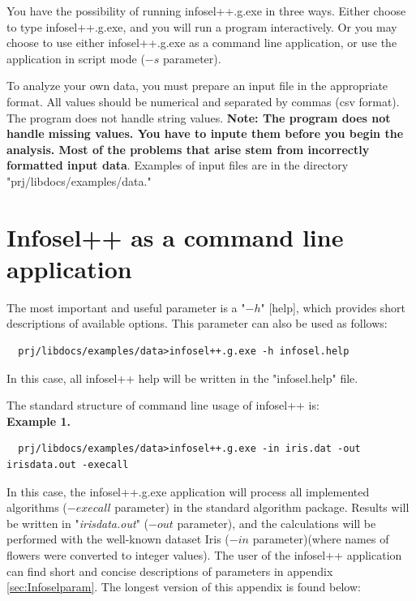 \documentclass[a4paper,fleqn]{report}
\begin{document}
You have the possibility of running infosel++.g.exe in three ways. Either choose to type infosel++.g.exe, and you will run a 
program interactively. Or you may choose to use either infosel++.g.exe as a command line application, or use the application 
in script mode ($-s$ parameter).

To analyze your own data, you must prepare an input file in the appropriate format. All values should be numerical 
and separated by commas (csv format). The program does not handle string values. {\bf Note: The program does not handle 
missing values. You have to inpute them before you begin the analysis. 
Most of the problems that arise stem from incorrectly formatted input data}. 
Examples of input files are in the directory "prj/libdocs/examples/data."

\section{Infosel++ as a command line application}

The most important and useful parameter is a "$-h$" [help], which provides short descriptions of available options. 
This parameter can also be used as follows: 
\begin{scriptsize}
  \begin{verbatim}
  prj/libdocs/examples/data>infosel++.g.exe -h infosel.help
  \end{verbatim}
\end{scriptsize}
In this case, all infosel++ help will be written in the "infosel.help" file.

The standard structure of command line usage of infosel++ is:
\\

{\bf Example 1.} 
\begin{scriptsize} \label{example:1}
  \begin{verbatim}
  prj/libdocs/examples/data>infosel++.g.exe -in iris.dat -out irisdata.out -execall 
  \end{verbatim}
\end{scriptsize}

In this case, the infosel++.g.exe application will process all implemented algorithms ($-execall$ parameter) 
in the standard algorithm package.
Results will be written in "{\it irisdata.out}" ($-out$ parameter), and the calculations will be performed 
with the well-known dataset Iris ($-in$ parameter)(where names of flowers were converted to integer values). 
The user of the infosel++ application can find 
short and concise descriptions of parameters in appendix \ref{sec:Infoselparam}.  The longest version of this appendix is found below:
\end{document}
